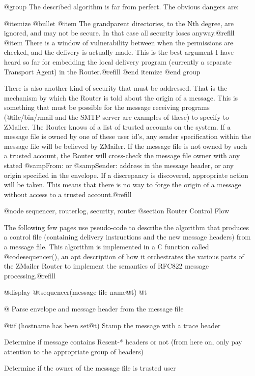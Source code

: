 {{@group
The described algorithm is far from perfect.  The obvious dangers are:

@itemize @bullet
@item
The grandparent directories, to the Nth degree, are ignored, and
may not be secure. In that case all security loses anyway.@refill
@item
There is a window of vulnerability between when the permissions
are checked, and the delivery is actually made. This is the
best argument I have heard so far for embedding the local delivery
program (currently a separate Transport Agent) in the Router.@refill
@end itemize
@end group

There is also another kind of security that must be addressed.  That is
the mechanism by which the Router is told about the origin of a
message.  This is something that must be possible for the message
receiving programs (@file{/bin/rmail} and the SMTP server are examples
of these) to specify to ZMailer.  The Router knows of a list of trusted
accounts on the system.  If a message file is owned by one of these
user id's, any sender specification within the message file will be
believed by ZMailer.  If the message file is not owned by such a
trusted account, the Router will cross-check the message file owner
with any stated @samp{From:} or @samp{Sender:} address in the message
header, or any origin specified in the envelope.  If a discrepancy is
discovered, appropriate action will be taken.  This means that there is
no way to forge the origin of a message without access to a trusted
account.@refill

@node sequencer, routerlog, security, router
@section Router Control Flow

The following few pages use pseudo-code to describe the algorithm that
produces a control file (containing delivery instructions and the new
message headers) from a message file.  This algorithm is implemented
in a C function called @code{sequencer()}, an apt description of how it
orchestrates the various parts of the ZMailer Router to implement the
semantics of RFC822 message processing.@refill

@display
@t{sequencer(}message file name@t{)}
@t{@{}
    Parse envelope and message header from the message file

    @t{if (}hostname has been set@t{)}
        Stamp the message with a trace header

    Determine if message contains Resent-* headers or not
    (from here on, only pay attention to the appropriate group of headers)

    Determine if the owner of the message file is trusted user

}}}
